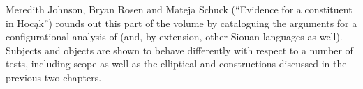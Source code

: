 \begin{refsection}
Meredith Johnson, Bryan Rosen and Mateja Schuck (``Evidence for a  constituent in Hoc\k{a}k'') rounds out this part of the volume by cataloguing the arguments for a configurational analysis of  (and, by extension, other Siouan languages as well). Subjects and objects are shown to behave differently with respect to a number of tests, including scope as well as the elliptical and  constructions discussed in the previous two chapters.

 
\end{refsection}

